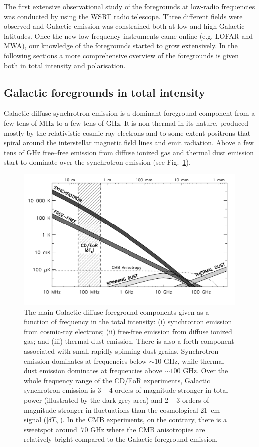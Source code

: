 The first extensive observational study of the foregrounds at low-radio frequencies was conducted by \cite{bernardi09, bernardi10} using the WSRT radio telescope. Three different fields were observed and Galactic emission was constrained both at low and high Galactic latitudes. Once the new low-frequency instruments came online (e.g. LOFAR and MWA), our knowledge of the foregrounds started to grow extensively. In the following sections a more comprehensive overview of the foregrounds is given both in total intensity and polarisation. 

\subsection{Galactic foregrounds in total intensity}
Galactic diffuse synchrotron emission is a dominant foreground component from a few tens of MHz to a few tens of GHz. It is non-thermal in its nature, produced mostly by the relativistic cosmic-ray electrons and to some extent positrons that spiral around the interstellar magnetic field lines and emit radiation.  Above a few tens of GHz free--free emission from diffuse ionized gas and thermal dust emission start to dominate over the synchrotron emission (see Fig.~\ref{fig:galcomp}). 

\begin{figure}[!t]
\centering
    \includegraphics[width=.95\textwidth]{Chapman_Jelic/Images/galcomp.png}
    \caption{The main Galactic diffuse foreground components given as a function of frequency in the total intensity: (i) synchrotron emission from cosmic-ray electrons; (ii) free-free emission from diffuse ionized gas; and (iii) thermal dust emission. There is also a forth component associated with small rapidly spinning dust grains. Synchrotron emission dominates at frequencies below $\sim 10$ GHz, while thermal dust emission dominates at frequencies above $\sim 100$ GHz. Over the whole frequency range of the CD/EoR experiments, Galactic synchrotron emission is 3 -- 4 orders of magnitude stronger in total power (illustrated by the dark grey area) and 2 -- 3 orders of magnitude stronger in fluctuations than the cosmological 21~cm signal ($|\delta T_b|$). In the CMB experiments, on the contrary, there is a sweetspot around $~70$ GHz where the CMB anisotropies are relatively bright compared to the Galactic foreground emission.}
    \label{fig:galcomp}
\end{figure}

